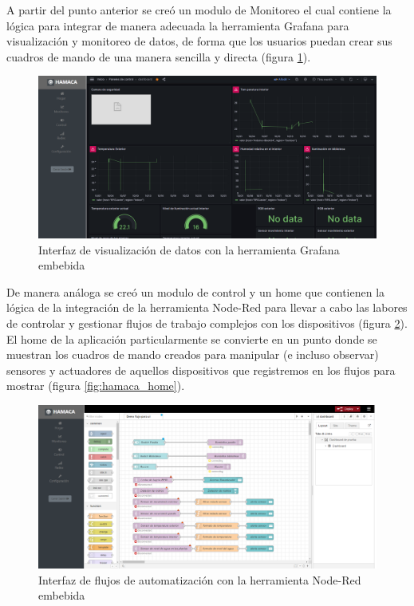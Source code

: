 A partir del punto anterior se creó un modulo de Monitoreo el cual contiene la lógica para integrar de manera adecuada la herramienta Grafana para visualización y monitoreo de datos, de forma que los usuarios puedan crear sus cuadros de mando de una manera sencilla y directa (figura \ref{fig:hamaca_grafana}).\\
\begin{figure}[!htb]
\centering
\includegraphics[scale=0.21]{./Figuras/hamaca_grafana.png}
\caption{Interfaz de visualización de datos con la herramienta Grafana embebida}
\label{fig:hamaca_grafana}
\vspace*{-10pt}
\end{figure}

De manera análoga se creó un modulo de control y un home que contienen la lógica de la integración de la herramienta Node-Red para llevar a cabo las labores de controlar y gestionar flujos de trabajo complejos con los dispositivos (figura \ref{fig:hamaca_nodered}). El home de la aplicación particularmente se convierte en un punto donde se muestran los cuadros de mando creados para manipular (e incluso observar) sensores y actuadores de aquellos dispositivos que registremos en los flujos para mostrar (figura \ref{fig:hamaca_home}).\\

\begin{figure}[!htb]
\centering
\includegraphics[scale=0.21]{./Figuras/hamaca_nodered.png}
\caption{Interfaz de flujos de automatización con la herramienta Node-Red embebida}
\label{fig:hamaca_nodered}
\vspace*{-10pt}
\end{figure}

